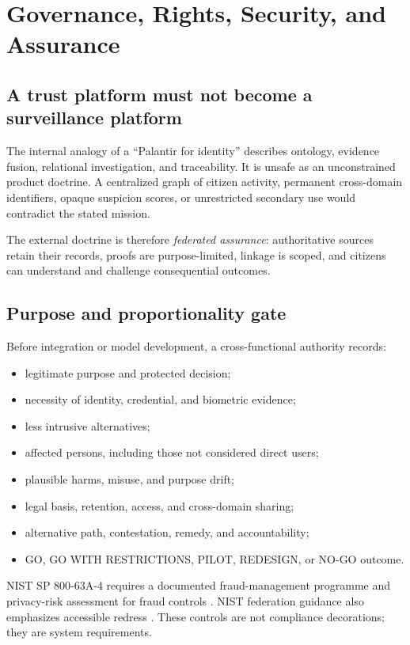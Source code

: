 \chapter{Governance, Rights, Security, and Assurance}

\section{A trust platform must not become a surveillance platform}

The internal analogy of a ``Palantir for identity'' describes ontology, evidence fusion, relational investigation, and traceability. It is unsafe as an unconstrained product doctrine. A centralized graph of citizen activity, permanent cross-domain identifiers, opaque suspicion scores, or unrestricted secondary use would contradict the stated mission.

The external doctrine is therefore \emph{federated assurance}: authoritative sources retain their records, proofs are purpose-limited, linkage is scoped, and citizens can understand and challenge consequential outcomes.

\section{Purpose and proportionality gate}

Before integration or model development, a cross-functional authority records:

\begin{itemize}
\item legitimate purpose and protected decision;
\item necessity of identity, credential, and biometric evidence;
\item less intrusive alternatives;
\item affected persons, including those not considered direct users;
\item plausible harms, misuse, and purpose drift;
\item legal basis, retention, access, and cross-domain sharing;
\item alternative path, contestation, remedy, and accountability;
\item GO, GO WITH RESTRICTIONS, PILOT, REDESIGN, or NO-GO outcome.
\end{itemize}

NIST SP 800-63A-4 requires a documented fraud-management programme and privacy-risk assessment for fraud controls \citep{nist63a4}. NIST federation guidance also emphasizes accessible redress \citep{nist63c4}. These controls are not compliance decorations; they are system requirements.

